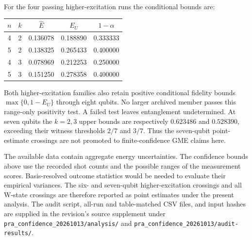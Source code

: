 For the four passing higher-excitation runs the conditional bounds are:
\begin{center}
\begin{tabular}{ccccc}
$n$ & $k$ & $\widehat E$ & $E_U$ & $1-\alpha$\\\hline
4 & 2 & 0.136078 & 0.188890 & 0.333333\\
5 & 2 & 0.138325 & 0.265433 & 0.400000\\
4 & 3 & 0.078969 & 0.212253 & 0.250000\\
5 & 3 & 0.151250 & 0.278358 & 0.400000\\
\end{tabular}
\end{center}
Both higher-excitation families also retain positive conditional fidelity
bounds $\max\{0,1-E_U\}$ through eight qubits. No larger archived member
passes this range-only positivity test. A failed test leaves entanglement undetermined. At seven qubits the $k=2,3$ upper bounds are respectively
$0.623486$ and $0.528390$, exceeding their witness thresholds $2/7$ and
$3/7$. Thus the seven-qubit point-estimate crossings are not promoted to
finite-confidence GME claims here.

The available data contain aggregate energy uncertainties. The confidence
bounds above use the recorded shot counts and the possible ranges of the
measurement scores. Basis-resolved outcome statistics would be needed to
evaluate their empirical variances. The six- and seven-qubit
higher-excitation crossings and all W-state crossings are therefore
reported as point estimates under the present analysis.
The audit script, all-run and table-matched CSV files, and input hashes
are supplied in the revision's source supplement under \texttt{pra\_confidence\_20261013/analysis/} and \texttt{pra\_confidence\_20261013/audit-results/}.

